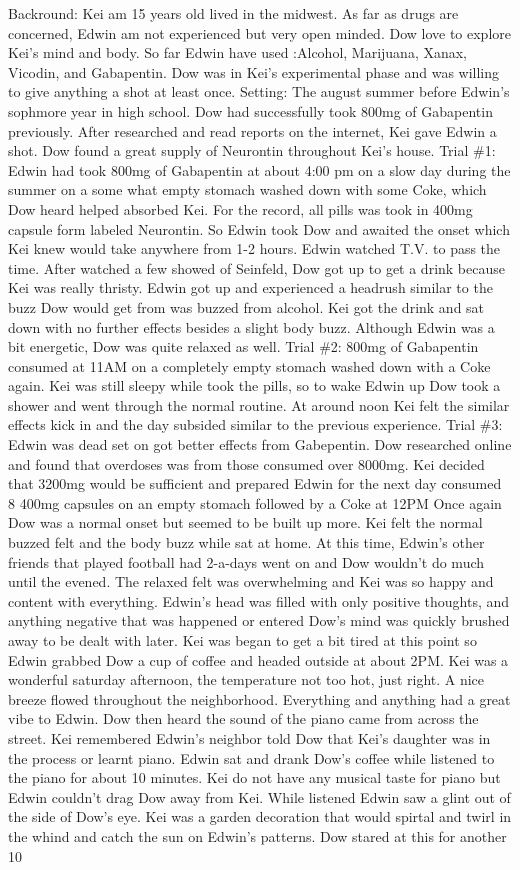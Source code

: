 \documentclass[12pt]{book}
\begin{document}
Backround: Kei am 15 years old lived in the midwest. As far as drugs are concerned, Edwin am not experienced but very open minded. Dow love to explore Kei's mind and body. So far Edwin have used :Alcohol, Marijuana, Xanax, Vicodin, and Gabapentin. Dow was in Kei's experimental phase and was willing to give anything a shot at least once. Setting: The august summer before Edwin's sophmore year in high school. Dow had successfully took 800mg of Gabapentin previously. After researched and read reports on the internet, Kei gave Edwin a shot. Dow found a great supply of Neurontin throughout Kei's house. Trial \#1: Edwin had took 800mg of Gabapentin at about 4:00 pm on a slow day during the summer on a some what empty stomach washed down with some Coke, which Dow heard helped absorbed Kei. For the record, all pills was took in 400mg capsule form labeled Neurontin. So Edwin took Dow and awaited the onset which Kei knew would take anywhere from 1-2 hours. Edwin watched T.V. to pass the time. After watched a few showed of Seinfeld, Dow got up to get a drink because Kei was really thristy. Edwin got up and experienced a headrush similar to the buzz Dow would get from was buzzed from alcohol. Kei got the drink and sat down with no further effects besides a slight body buzz. Although Edwin was a bit energetic, Dow was quite relaxed as well. Trial \#2: 800mg of Gabapentin consumed at 11AM on a completely empty stomach washed down with a Coke again. Kei was still sleepy while took the pills, so to wake Edwin up Dow took a shower and went through the normal routine. At around noon Kei felt the similar effects kick in and the day subsided similar to the previous experience. Trial \#3: Edwin was dead set on got better effects from Gabepentin. Dow researched online and found that overdoses was from those consumed over 8000mg. Kei decided that 3200mg would be sufficient and prepared Edwin for the next day consumed 8 400mg capsules on an empty stomach followed by a Coke at 12PM Once again Dow was a normal onset but seemed to be built up more. Kei felt the normal buzzed felt and the body buzz while sat at home. At this time, Edwin's other friends that played football had 2-a-days went on and Dow wouldn't do much until the evened. The relaxed felt was overwhelming and Kei was so happy and content with everything. Edwin's head was filled with only positive thoughts, and anything negative that was happened or entered Dow's mind was quickly brushed away to be dealt with later. Kei was began to get a bit tired at this point so Edwin grabbed Dow a cup of coffee and headed outside at about 2PM. Kei was a wonderful saturday afternoon, the temperature not too hot, just right. A nice breeze flowed throughout the neighborhood. Everything and anything had a great vibe to Edwin. Dow then heard the sound of the piano came from across the street. Kei remembered Edwin's neighbor told Dow that Kei's daughter was in the process or learnt piano. Edwin sat and drank Dow's coffee while listened to the piano for about 10 minutes. Kei do not have any musical taste for piano but Edwin couldn't drag Dow away from Kei. While listened Edwin saw a glint out of the side of Dow's eye. Kei was a garden decoration that would spirtal and twirl in the whind and catch the sun on Edwin's patterns. Dow stared at this for another 10 
\end{document}
